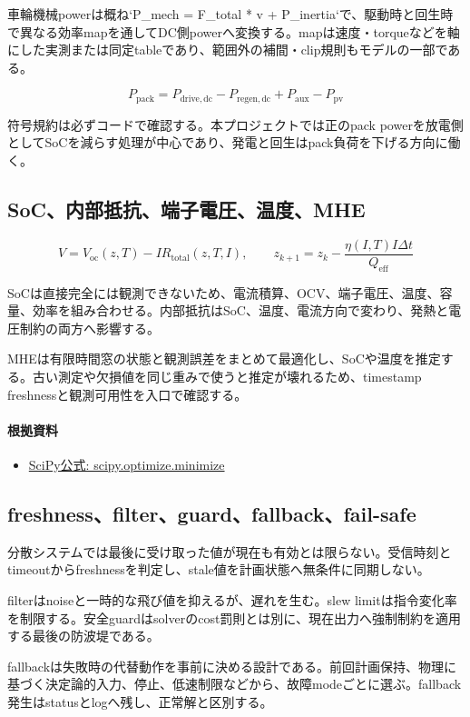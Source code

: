 \documentclass[a4paper,11pt]{article}
\begin{document}
車輪機械powerは概ね`P\_mech = F\_total * v + P\_inertia`で、駆動時と回生時で異なる効率mapを通してDC側powerへ変換する。mapは速度・torqueなどを軸にした実測または同定tableであり、範囲外の補間・clip規則もモデルの一部である。


\[
P_{\mathrm{pack}}=P_{\mathrm{drive,dc}}-P_{\mathrm{regen,dc}}+P_{\mathrm{aux}}-P_{\mathrm{pv}}
\]

符号規約は必ずコードで確認する。本プロジェクトでは正のpack powerを放電側としてSoCを減らす処理が中心であり、発電と回生はpack負荷を下げる方向に働く。



\subsection{SoC、内部抵抗、端子電圧、温度、MHE}
\[
V=V_{\mathrm{oc}}(z,T)-IR_{\mathrm{total}}(z,T,I),\qquad z_{k+1}=z_k-\frac{\eta(I,T)I\Delta t}{Q_{\mathrm{eff}}}
\]

SoCは直接完全には観測できないため、電流積算、OCV、端子電圧、温度、容量、効率を組み合わせる。内部抵抗はSoC、温度、電流方向で変わり、発熱と電圧制約の両方へ影響する。


MHEは有限時間窓の状態と観測誤差をまとめて最適化し、SoCや温度を推定する。古い測定や欠損値を同じ重みで使うと推定が壊れるため、timestamp freshnessと観測可用性を入口で確認する。

\paragraph{根拠資料}
\begin{itemize}[leftmargin=1.6em]
\item \href{https://docs.scipy.org/doc/scipy/reference/generated/scipy.optimize.minimize.html}{SciPy公式: scipy.optimize.minimize}
\end{itemize}

\subsection{freshness、filter、guard、fallback、fail-safe}
分散システムでは最後に受け取った値が現在も有効とは限らない。受信時刻とtimeoutからfreshnessを判定し、stale値を計画状態へ無条件に同期しない。


filterはnoiseと一時的な飛び値を抑えるが、遅れを生む。slew limitは指令変化率を制限する。安全guardはsolverのcost罰則とは別に、現在出力へ強制制約を適用する最後の防波堤である。


fallbackは失敗時の代替動作を事前に決める設計である。前回計画保持、物理に基づく決定論的入力、停止、低速制限などから、故障modeごとに選ぶ。fallback発生はstatusとlogへ残し、正常解と区別する。
\end{document}
